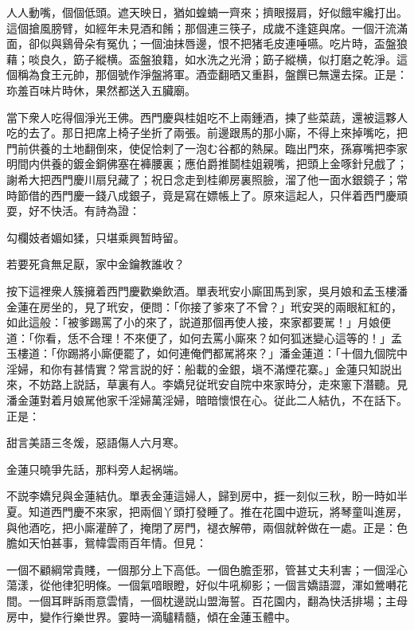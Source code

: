 \begin{myquote}
人人動嘴，個個低頭。遮天映日，猶如蝗蝻一齊來；擠眼掇肩，好似餓牢纔打出。這個搶風膀臂，如經年未見酒和餚；那個連三筷子，成歲不逢筵與席。一個汗流滿面，卻似與鷄骨朵有冤仇；一個油抹唇邊，恨不把猪毛皮連唾嚥。吃片時，盃盤狼藉；啖良久，筯子縱横。盃盤狼籍，如水洗之光滑；筯子縱横，似打磨之乾淨。這個稱為食王元帥，那個號作淨盤將軍。酒壶翻晒又重斟，盤饌已無還去探。正是：珎羞百味片時休，果然都送入五臟廟。
\end{myquote}

當下衆人吃得個淨光王佛。西門慶與桂姐吃不上兩鍾酒，揀了些菜蔬，還被這夥人吃的去了。那日把席上椅子坐折了兩張。前邊跟馬的那小廝，不得上來掉嘴吃，把門前供養的土地翻倒來，使促恰剌了一泡む谷都的熱屎。臨出門來，孫寡嘴把李家明間内供養的鍍金銅佛塞在褲腰裏；應伯爵推鬬桂姐親嘴，把頭上金啄針兒戲了；謝希大把西門慶川扇兒藏了；祝日念走到桂卿房裏照臉，溜了他一面水銀鏡子；常時節借的西門慶一錢八成銀子，竟是寫在嫖帳上了。原來這起人，只伴着西門慶頑耍，好不快活。有詩為證：

\begin{myquote}
勾欄妓者媚如猱，只堪乘興暂時留。

若要死貪無足厭，家中金鑰教誰收？
\end{myquote}

按下這裡衆人簇擁着西門慶歡樂飲酒。單表玳安小廝囬馬到家，吳月娘和孟玉樓潘金蓮在房坐的，見了玳安，便問：「你接了爹來了不曾？」玳安哭的兩眼紅紅的，如此這般：「被爹踢罵了小的來了，説道那個再使人接，來家都要駡！」月娘便道：「你看，恁不合理！不來便了，如何去罵小廝來？如何狐迷變心這等的！」孟玉樓道：「你踢將小廝便罷了，如何連俺們都駡將來？」潘金蓮道：「十個九個院中淫婦，和你有甚情實？常言説的好：船載的金銀，塡不滿煙花寨。」金蓮只知説出來，不妨路上説話，草裏有人。李嬌兒従玳安自院中來家時分，走來窻下潛聽。見潘金蓮對着月娘駡他家千淫婦萬淫婦，暗暗懷恨在心。従此二人結仇，不在話下。正是：

\begin{myquote}
甜言美語三冬煖，惡語傷人六月寒。

金蓮只曉爭先話，那料旁人起祸端。
\end{myquote}

不説李嬌兒與金蓮結仇。單表金蓮這婦人，歸到房中，捱一刻似三秋，盼一時如半夏。知道西門慶不來家，把兩個丫頭打發睡了。推在花園中遊玩，將琴童叫進房，與他酒吃，把小廝灌醉了，掩閉了房門，褪衣解帶，兩個就幹做在一處。正是：色膽如天怕甚事，鴛幃雲雨百年情。但見：

\begin{myquote}
一個不顧綱常貴賤，一個那分上下高低。一個色膽歪邪，管甚丈夫利害；一個淫心蕩漾，從他律犯明條。一個氣喑眼瞪，好似牛吼柳影；一個言嬌語澀，渾如鶯囀花間。一個耳畔訴雨意雲情，一個枕邊説山盟海誓。百花園内，翻為快活排場；主母房中，變作行樂世界。霎時一滴驢精髓，傾在金蓮玉體中。
\end{myquote}

